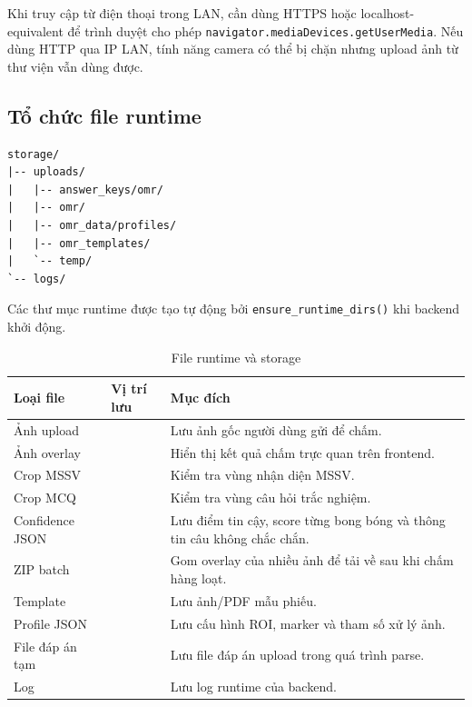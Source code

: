 Khi truy cập từ điện thoại trong LAN, cần dùng HTTPS hoặc localhost-equivalent để trình duyệt cho phép \texttt{navigator.mediaDevices.getUserMedia}. Nếu dùng HTTP qua IP LAN, tính năng camera có thể bị chặn nhưng upload ảnh từ thư viện vẫn dùng được.

\subsection{Tổ chức file runtime}

\begin{lstlisting}[caption={Cấu trúc storage runtime}, label={lst:runtime_storage}, basicstyle=\ttfamily\small, breaklines=true, frame=single, showstringspaces=false]
storage/
|-- uploads/
|   |-- answer_keys/omr/
|   |-- omr/
|   |-- omr_data/profiles/
|   |-- omr_templates/
|   `-- temp/
`-- logs/
\end{lstlisting}

Các thư mục runtime được tạo tự động bởi \texttt{ensure\_runtime\_dirs()} khi backend khởi động.

\begin{longtable}{|L{3.4cm}|L{4.5cm}|L{6.2cm}|}
\caption{File runtime và storage}
\label{tab:file-runtime-storage}\\
\hline
\textbf{Loại file} & \textbf{Vị trí lưu} & \textbf{Mục đích} \\
\hline
Ảnh upload &  & Lưu ảnh gốc người dùng gửi để chấm. \\
\hline
Ảnh overlay &  & Hiển thị kết quả chấm trực quan trên frontend. \\
\hline
Crop MSSV &  & Kiểm tra vùng nhận diện MSSV. \\
\hline
Crop MCQ &  & Kiểm tra vùng câu hỏi trắc nghiệm. \\
\hline
Confidence JSON &  & Lưu điểm tin cậy, score từng bong bóng và thông tin câu không chắc chắn. \\
\hline
ZIP batch &  & Gom overlay của nhiều ảnh để tải về sau khi chấm hàng loạt. \\
\hline
Template &  & Lưu ảnh/PDF mẫu phiếu. \\
\hline
Profile JSON &  & Lưu cấu hình ROI, marker và tham số xử lý ảnh. \\
\hline
File đáp án tạm &  & Lưu file đáp án upload trong quá trình parse. \\
\hline
Log &  & Lưu log runtime của backend. \\
\hline
\end{longtable}

